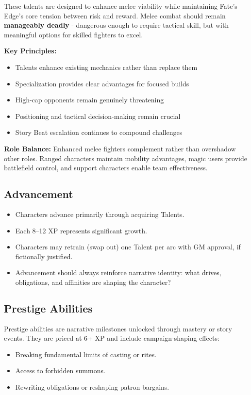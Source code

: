These talents are designed to enhance melee viability while maintaining Fate's Edge's core tension between risk and reward. Melee combat should remain \textbf{manageably deadly} - dangerous enough to require tactical skill, but with meaningful options for skilled fighters to excel.

\textbf{Key Principles:}
\begin{itemize}
    \item Talents enhance existing mechanics rather than replace them
    \item Specialization provides clear advantages for focused builds
    \item High-cap opponents remain genuinely threatening
    \item Positioning and tactical decision-making remain crucial
    \item Story Beat escalation continues to compound challenges
\end{itemize}

\textbf{Role Balance:} Enhanced melee fighters complement rather than overshadow other roles. Ranged characters maintain mobility advantages, magic users provide battlefield control, and support characters enable team effectiveness.

\subsection{Advancement}
\begin{itemize}
  \item Characters advance primarily through acquiring Talents.
  \item Each 8–12 XP represents significant growth.
  \item Characters may retrain (swap out) one Talent per arc with GM approval, if fictionally justified.
  \item Advancement should always reinforce narrative identity: what drives, obligations, and affinities are shaping the character?
\end{itemize}

\subsection{Prestige Abilities}
Prestige abilities are narrative milestones unlocked through mastery or story events. They are priced at 6+ XP and include campaign-shaping effects:
\begin{itemize}
  \item Breaking fundamental limits of casting or rites.
  \item Access to forbidden summons.
  \item Rewriting obligations or reshaping patron bargains.
\end{itemize}

